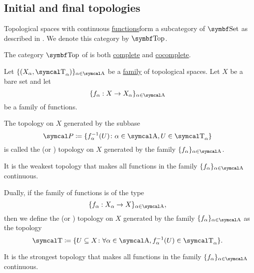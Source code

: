 \subsection{Initial and final topologies}\label{subsec:initial_final_topologies}

\begin{definition}\label{def:category_of_topological_spaces}
  Topological spaces with continuous \hyperref[def:global_continuity]{functions}form a subcategory of \( \Cat{Set} \) as described in . We denote this category by \( \Cat{Top} \).
\end{definition}

\begin{theorem}\label{thm:top_complete_cocomplete}
  The category \( \Cat{Top} \) of is both \hyperref[def:categorical_limit]{complete} and \hyperref[def:categorical_colimit]{cocomplete}.
\end{theorem}

\begin{definition}\label{def:initial_topology}\cite{nLab:top}
  Let \( \{ (X_\al, \CT_\al) \}_{\al \in \CA} \) be a \hyperref[def:indexed_family]{family} of topological spaces. Let \( X \) be a bare set and let
  \begin{equation*}
    \{ f_\al: X \to X_\al \}_{\al \in \CA}
  \end{equation*}
  be a family of functions.

  The topology on \( X \) generated by the subbase
  \begin{equation*}
    \Cal{P} \coloneqq \{ f_\al^{-1}(U) \colon \al \in \CA, U \in \CT_\al \}
  \end{equation*}
  is called the  (or ) topology on \( X \) generated by the family \( \{ f_\al \}_{\al \in \CA} \).

  It is the weakest topology that makes all functions in the family \( \{ f_\al \}_{\al \in \CA} \) continuous.
\end{definition}

\begin{definition}\label{def:final_topology}\cite{nLab:top}
  Dually, if the family of functions is of the type
  \begin{equation*}
    \{ f_\al: X_\al \to X \}_{\al \in \CA},
  \end{equation*}
  then we define the  (or ) topology on \( X \) generated by the family \( \{ f_\al \}_{\al \in \CA} \) as the topology
  \begin{equation*}
    \CT \coloneqq \{ U \subseteq X \colon \forall \al \in \CA, f_\al^{-1}(U) \in \CT_\al \}.
  \end{equation*}

  It is the strongest topology that makes all functions in the family \( \{ f_\al \}_{\al \in \CA} \) continuous.
\end{definition}

